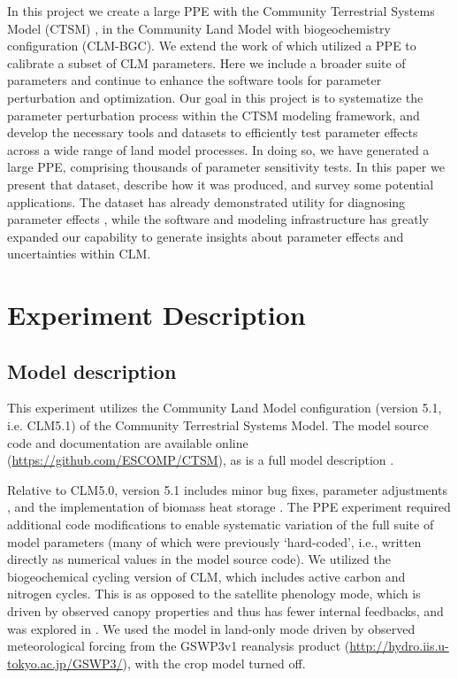 \documentclass[draft]{agujournal2019}
\begin{document}
In this project we create a large PPE with the Community Terrestrial Systems Model (CTSM) \cite{lawrence2019}, in the Community Land Model with biogeochemistry configuration (CLM-BGC). We extend the work of  which utilized a PPE to calibrate a subset of CLM parameters. Here we include a broader suite of parameters and continue to enhance the software tools for parameter perturbation and optimization.
Our goal in this project is to systematize the parameter perturbation process within the CTSM modeling framework, and develop the necessary tools and datasets to efficiently test parameter effects across a wide range of land model processes. 
In doing so, we have generated a large PPE, comprising thousands of parameter sensitivity tests.
In this paper we present that dataset, describe how it was produced, and survey some potential applications.
The dataset has already demonstrated utility for diagnosing parameter effects \cite{cheng2023,yan2023a,yan2023b}, while the software and modeling infrastructure has greatly expanded our capability to generate insights about parameter effects and uncertainties within CLM.




\section{Experiment Description}
\label{methods}
\subsection{Model description}
\label{sect:md}
This experiment utilizes the Community Land Model configuration (version 5.1, i.e. CLM5.1) of the Community Terrestrial Systems Model. The model source code and documentation are available online (\url{https://github.com/ESCOMP/CTSM}), as is a full model description \cite{lawrence2019}.

Relative to CLM5.0, version 5.1 includes minor bug fixes, parameter adjustments \cite{birch2021}, and the implementation of biomass heat storage \cite{swenson2019}. The PPE experiment required additional code modifications to enable systematic variation of the full suite of model parameters (many of which were previously `hard-coded', i.e., written directly as numerical values in the model source code). We utilized the biogeochemical cycling version of CLM, which includes active carbon and nitrogen cycles. This is as opposed to the satellite phenology mode, which is driven by observed canopy properties and thus has fewer internal feedbacks, and was explored in . We used the model in land-only mode driven by observed meteorological forcing from the GSWP3v1 reanalysis product (\url{http://hydro.iis.u-tokyo.ac.jp/GSWP3/}), with the crop model turned off.
\end{document}
